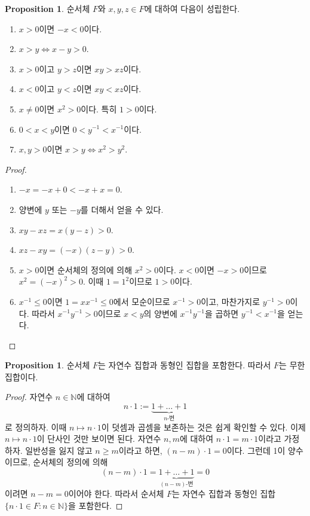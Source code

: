 \documentclass[11pt]{book}
\numberwithin{equation}{chapter}
\def\NN{\mathbb{N}}
\theoremstyle{definition}
\newtheorem{prop}[thm]{Proposition}
\begin{document}
    \begin{prop} \label{prop 1.2.4}
        순서체 \(F\)와 \(x, y, z \in F\)에 대하여 다음이 성립한다.
        \begin{enumerate}[label=(\alph*), leftmargin=2\parindent]
            \item \(x > 0\)이면 \(-x < 0\)이다.
            \item \(x > y \iff x - y > 0\).
            \item \(x > 0\)이고 \(y > z\)이면 \(xy > xz\)이다.
            \item \(x < 0\)이고 \(y < z\)이면 \(xy < xz\)이다.
            \item \(x \ne 0\)이면 \(x^2 > 0\)이다. 특히 \(1 > 0\)이다.
            \item \(0 < x < y\)이면 \(0 < y^{-1} < x^{-1}\)이다.
            \item \(x, y > 0\)이면 \(x > y \iff x^2 > y^2\).
        \end{enumerate}
    \end{prop}
    \begin{proof}
        \quad

        \begin{enumerate}[label=(\alph*), leftmargin=2\parindent]
            \item \(-x = -x + 0 < -x + x = 0\).
            \item 양변에 \(y\) 또는 \(-y\)를 더해서 얻을 수 있다.
            \item \(xy - xz = x(y-z) > 0\).
            \item \(xz - xy = (-x)(z - y) > 0\).
            \item \(x > 0\)이면 순서체의 정의에 의해 \(x^2 > 0\)이다. \(x < 0\)이면 \(-x > 0\)이므로 \(x^2 = (-x)^2 > 0\). 이때 \(1 = 1^2\)이므로 \(1 > 0\)이다.
            \item \(x^{-1} \le 0\)이면 \(1 = xx^{-1} \le 0\)에서 모순이므로 \(x^{-1} > 0\)이고, 마찬가지로 \(y^{-1} > 0\)이다. 따라서 \(x^{-1}y^{-1} > 0\)이므로 \(x < y\)의 양변에 \(x^{-1}y^{-1}\)을 곱하면 \(y^{-1} < x^{-1}\)을 얻는다.
        \end{enumerate}
    \end{proof}

    \begin{prop}
        순서체 \(F\)는 자연수 집합과 동형인 집합을 포함한다. 따라서 \(F\)는 무한집합이다.
    \end{prop}
    \begin{proof}
        자연수 \(n \in \NN\)에 대하여
        \[
        n \cdot 1 := \underbrace{1 + \ldots + 1}_{n\text{-번}}
        \]
        로 정의하자. 이때 \(n \mapsto n \cdot 1\)이 덧셈과 곱셈을 보존하는 것은 쉽게 확인할 수 있다. 이제 \(n \mapsto n \cdot 1\)이 단사인 것만 보이면 된다. 자연수 \(n, m\)에 대하여 \(n \cdot 1 = m \cdot 1\)이라고 가정하자. 일반성을 잃지 않고 \(n \ge m\)이라고 하면, \((n - m) \cdot 1 = 0\)이다. 그런데 1이 양수이므로, 순서체의 정의에 의해
        \[
        (n - m) \cdot 1 = \underbrace{1 + \ldots + 1}_{(n-m)\text{-번}} = 0
        \]
        이려면 \(n - m = 0\)이어야 한다. 따라서 순서체 \(F\)는 자연수 집합과 동형인 집합 \(\{n \cdot 1 \in F: n \in \NN\}\)을 포함한다.
    \end{proof}
\end{document}

